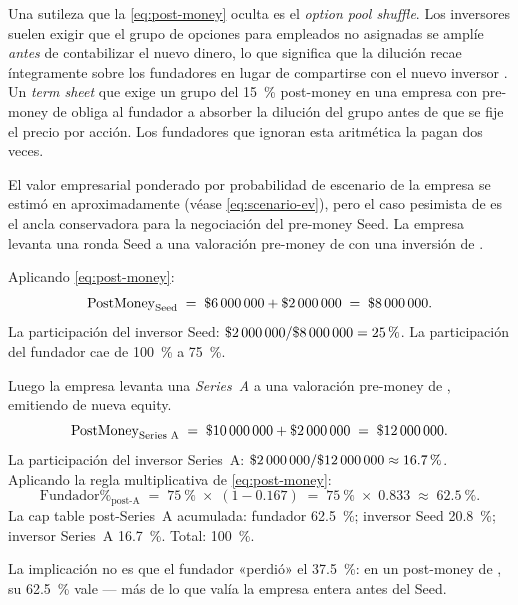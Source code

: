 Una sutileza que la \cref{eq:post-money} oculta es el \emph{option pool shuffle}. Los
inversores suelen exigir que el grupo de opciones para empleados no asignadas se amplíe
\emph{antes} de contabilizar el nuevo dinero, lo que significa que la dilución recae
íntegramente sobre los fundadores en lugar de compartirse con el nuevo inversor
\parencite{feld2019venture}. Un \emph{term sheet} que exige un grupo del \qty{15}{\percent}
post-money en una empresa con pre-money de  obliga al fundador a absorber
la dilución del grupo antes de que se fije el precio por acción. Los fundadores que ignoran
esta aritmética la pagan dos veces.

\begin{example}
El valor empresarial ponderado por probabilidad de escenario de la empresa se estimó en
aproximadamente  (véase \cref{eq:scenario-ev}), pero el caso pesimista de
 es el ancla conservadora para la negociación del pre-money Seed. La empresa
levanta una ronda Seed a una valoración pre-money de  con una inversión de
.

Aplicando \cref{eq:post-money}:
\[
  \mathrm{PostMoney}_{\text{Seed}} \;=\; \$\num{6000000} + \$\num{2000000} \;=\; \$\num{8000000}.
\]
La participación del inversor Seed: \(\$\num{2000000}/\$\num{8000000} = \qty{25}{\percent}\).
La participación del fundador cae de \qty{100}{\percent} a \qty{75}{\percent}.

Luego la empresa levanta una \emph{Series~A} a una valoración pre-money de ,
emitiendo  de nueva equity.
\[
  \mathrm{PostMoney}_{\text{Series A}} \;=\; \$\num{10000000} + \$\num{2000000} \;=\; \$\num{12000000}.
\]
La participación del inversor Series~A: \(\$\num{2000000}/\$\num{12000000} \approx \qty{16.7}{\percent}\).
Aplicando la regla multiplicativa de \cref{eq:post-money}:
\[
  \text{Fundador\%}_{\text{post-A}}
  \;=\; \qty{75}{\percent} \;\times\; (1 - 0.167)
  \;=\; \qty{75}{\percent} \;\times\; 0.833
  \;\approx\; \qty{62.5}{\percent}.
\]
La cap table post-Series~A acumulada: fundador \qty{62.5}{\percent}; inversor Seed
\qty{20.8}{\percent}; inversor Series~A \qty{16.7}{\percent}. Total: \qty{100}{\percent}.

La implicación no es que el fundador «perdió» el \qty{37.5}{\percent}: en un post-money de
, su \qty{62.5}{\percent} vale  --- más de lo que valía la
empresa entera antes del Seed.
\end{example}

